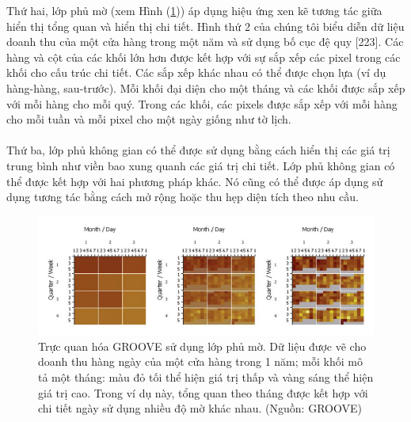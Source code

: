 Thứ hai, lớp phủ mờ (xem Hình (\ref{fig:f7.6})) áp dụng hiệu ứng xen kẽ tương tác giữa hiển thị tổng quan và hiển thị chi tiết. Hình thứ 2 của chúng tôi biểu diễn dữ liệu doanh thu của một cửa hàng trong một năm và sử dụng bố cục đệ quy [223]. Các hàng và cột của các khối lớn hơn được kết hợp với sự sắp xếp các pixel trong các khối cho cấu trúc chi tiết. Các sắp xếp khác nhau có thể được chọn lựa (ví dụ hàng-hàng, sau-trước). Mỗi khối đại diện cho một tháng và các khối được sắp xếp với mỗi hàng cho mỗi quý. Trong các khối, các pixels được sắp xếp với mỗi hàng cho mỗi tuần và mỗi pixel cho một ngày giống như tờ lịch. 
\\ \\
Thứ ba, lớp phủ không gian có thể được sử dụng bằng cách hiển thị các giá trị trung bình như viền bao xung quanh các giá trị chi tiết. Lớp phủ không gian có thể được kết hợp với hai phương pháp khác. Nó cũng có thể được áp dụng sử dụng tương tác bằng cách mở rộng hoặc thu hẹp diện tích theo nhu cầu.
\begin{figure}[H] %
    \centering %
    \includegraphics[width=1\textwidth]{assets/fig_7_6.png} 
    \caption{Trực quan hóa GROOVE sử dụng lớp phủ mờ. Dữ liệu được vẽ cho doanh thu hàng ngày của một cửa hàng trong 1 năm; mỗi khối mô tả một tháng: màu đỏ tối thể hiện giá trị thấp và vàng sáng thể hiện giá trị cao. Trong ví dụ này, tổng quan theo tháng được kết hợp với chi tiết ngày sử dụng nhiều độ mờ khác nhau. (Nguồn: GROOVE)} %
    \label{fig:f7.6}
\end{figure}